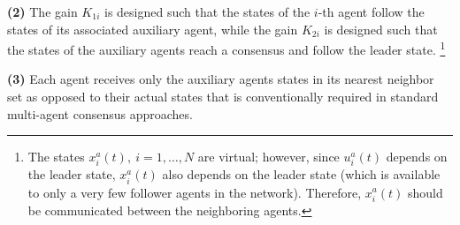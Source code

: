 \documentclass[12pt,draftcls,onecolumn]{IEEEtran}
\begin{document}
  \textbf{(2)} The gain $K_{1i}$ is designed such that the states of the $i$-th agent follow the states of its associated auxiliary agent,  while the gain $K_{2i}$ is designed such that the states of the auxiliary agents reach a consensus and follow the leader state. 
\footnote{The states $x_i^a(t),\ i=1,\dots,N$ are virtual; however, since $u_i^a(t)$ depends on the leader state, $x_i^a(t)$ also depends on the leader state  (which is  available to only a very few follower agents in the network). Therefore, $x_i^a(t)$ should be communicated between the neighboring agents.}  
\par
\textbf{(3)} Each agent receives only the auxiliary agents states in its nearest neighbor set as opposed to  their actual states 
 that is conventionally required in standard multi-agent consensus approaches. 
 
\end{document}
